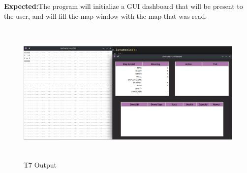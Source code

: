 \documentclass{article}
\begin{document}
\begin{description}
    \textbf{Expected:}{The program will initialize a GUI dashboard that will be present to the user, and will fill the map window with the map that was read.}
    \begin{figure}[htp]
    \includegraphics[width=15cm, height=7cm]{testcase7.png}
    
    \caption{T7 Output}
    \label{fig:galaxy}
\end{figure}
\end{description}
\end{document}
